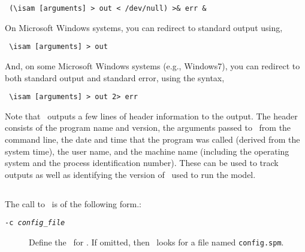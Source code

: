\begin{verbatim} (\isam [arguments] > out < /dev/null) >& err &\end{verbatim}

On Microsoft Windows systems, you can redirect to standard output using,

\begin{verbatim} \isam [arguments] > out\end{verbatim}

And, on some Microsoft Windows systems (e.g., Windows7), you can redirect to both standard output and standard error, using the syntax, 

\begin{verbatim} \isam [arguments] > out 2> err\end{verbatim}

Note that \iSAM\ outputs a few lines of header information to the output. The header consists of the program name and version, the arguments passed to \iSAM\ from the command line, the date and time that the program was called (derived from the system time), the user name, and the machine name (including the operating system and the process identification number). These can be used to track outputs as well as identifying the version of \iSAM\ used to run the model.

\subsection{\label{sec:command-line-arguments}}
\CH
The call to \iSAM\ is of the following form.: 

\texttt{}

\begin{description}
  \item [\texttt{-c \emph{config\_file}}] Define the \config\ for \iSAM. If omitted, then \iSAM\ looks for a file named \texttt{config.spm}.
\end{description}

